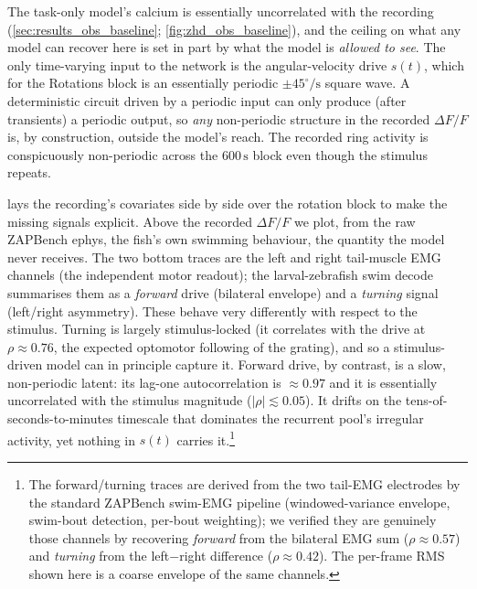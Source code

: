 \documentclass[11pt]{article}
\begin{document}
The task-only model's calcium is essentially uncorrelated with the
recording (\cref{sec:results_obs_baseline}; \cref{fig:zhd_obs_baseline}),
and the ceiling on what any model can recover here is set in part by
what the model is \emph{allowed to see}. The only time-varying input
to the network is the angular-velocity drive $s(t)$, which for the
Rotations block is an essentially periodic $\pm 45^\circ/\mathrm{s}$
square wave. A deterministic circuit driven by a periodic input can
only produce (after transients) a periodic output, so \emph{any}
non-periodic structure in the recorded $\Delta F/F$ is, by construction,
outside the model's reach. The recorded ring activity is
conspicuously non-periodic across the $600\,\mathrm{s}$ block even
though the stimulus repeats.

 lays the recording's covariates side by side
over the rotation block to make the missing signals explicit. Above
the recorded $\Delta F/F$ we plot, from the raw ZAPBench ephys, the
fish's own swimming behaviour, the quantity the model never
receives. The two bottom traces are the left and right tail-muscle
EMG channels (the independent motor readout); the larval-zebrafish
swim decode summarises them as a \emph{forward} drive (bilateral
envelope) and a \emph{turning} signal (left/right asymmetry). These
behave very differently with respect to the stimulus. Turning is
largely stimulus-locked (it correlates with the drive at
$\rho \approx 0.76$, the expected optomotor following of the grating),
and so a stimulus-driven model can in principle capture it.
Forward drive, by contrast, is a slow, non-periodic latent: its
lag-one autocorrelation is $\approx 0.97$ and it is essentially
uncorrelated with the stimulus magnitude ($|\rho| \lesssim 0.05$). It
drifts on the tens-of-seconds-to-minutes timescale that dominates the
recurrent pool's irregular activity, yet nothing in $s(t)$ carries
it.\footnote{The forward/turning traces are derived from the two
tail-EMG electrodes by the standard ZAPBench swim-EMG pipeline
(windowed-variance envelope, swim-bout detection, per-bout weighting);
we verified they are genuinely those channels by recovering
\emph{forward} from the bilateral EMG sum ($\rho \approx 0.57$) and
\emph{turning} from the left$-$right difference ($\rho \approx 0.42$).
The per-frame RMS shown here is a coarse envelope of the same
channels.}
\end{document}
